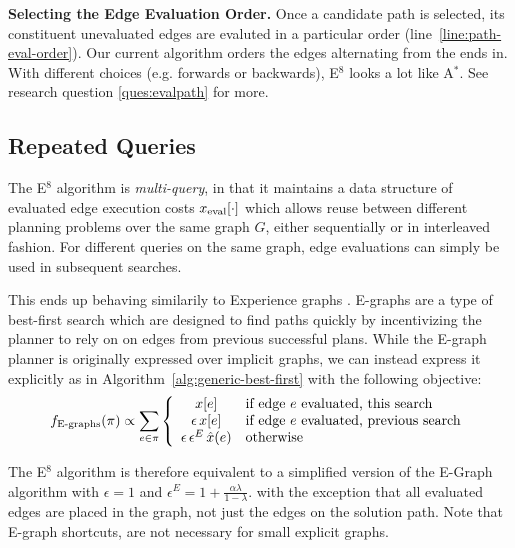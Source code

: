 \textbf{Selecting the Edge Evaluation Order.}
\label{subsec:alg-path-evaluation}
Once a candidate path is selected,
its constituent unevaluated edges are evaluted
in a particular order (line~\ref{line:path-eval-order}).
Our current algorithm
orders the edges alternating from the ends in.
With different choices (e.g. forwards or backwards),
E$^8$ looks a lot like A$^*$.
See research question \ref{ques:evalpath}
for more.

\subsection{Repeated Queries}

The E$^8$ algorithm is \emph{multi-query},
in that it maintains a data structure of evaluated edge
execution costs $x_{\mbox{\scriptsize eval}}[\cdot]$
which allows reuse between different planning problems
over the same graph $G$,
either sequentially or in interleaved fashion.
For different queries on the same graph,
edge evaluations can simply be used in subsequent searches.

This ends up behaving similarily to Experience graphs
\cite{phillips2012egraphs}.
E-graphs are a type of best-first search which
are designed to find paths quickly by incentivizing the planner
to rely on on edges from previous successful plans.
While the E-graph planner is originally expressed over implicit graphs,
we can instead express it explicitly
as in Algorithm~\ref{alg:generic-best-first}
with the following objective:
\begin{equation}
   f_{\mbox{\scriptsize E-graphs}}(\pi) \propto \sum_{e \in \pi} \left\{
   \begin{array}{cl}
      x[e] & \mbox{if edge } e \mbox{ evaluated, this search} \\
      \epsilon \, x[e] & \mbox{if edge } e \mbox{ evaluated, previous search} \\
     \epsilon \, \epsilon^E \, \hat{x}(e) & \mbox{otherwise} \\
   \end{array}
   \right.
\end{equation}

The E$^8$ algorithm
is therefore equivalent to a simplified version of the E-Graph algorithm
with $\epsilon=1$ and $\epsilon^E = 1 + \frac{\alpha \lambda}{1-\lambda}$.
with the exception that all evaluated edges are placed in the graph,
not just the edges on the solution path.
Note that E-graph shortcuts,
are not necessary for small explicit graphs.

